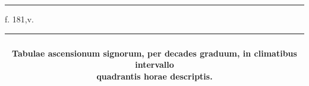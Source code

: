 \documentclass[11pt]{article}
\renewcommand{\arraystretch}{1.18}
\begin{document}
\par\vspace{-1mm}\noindent\rule{\textwidth}{.4pt}\par\vspace{1mm}
\begin{center}{\small f. 181,v.}\end{center}\vspace{-3mm}
\begin{center}\setlength{\tabcolsep}{2.5pt}\renewcommand{\arraystretch}{1.0}\begin{tabular}{||c|c|>{\centering\arraybackslash}p{23mm}|>{\centering\arraybackslash}p{23mm}|>{\centering\arraybackslash}p{23mm}|>{\centering\arraybackslash}p{23mm}|>{\centering\arraybackslash}p{23mm}|>{\centering\arraybackslash}p{23mm}||}\hline
\multicolumn{8}{||c||}{\parbox{175mm}{\centering{}\\\textbf{Tabulae ascensionum signorum, per decades graduum, in climatibus intervallo}\\\textbf{quadrantis horae descriptis.}\vspace{1mm}}} \\ \hline

\end{tabular}
\end{center}
\end{document}
